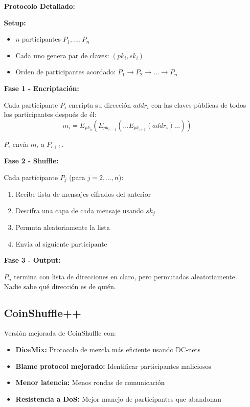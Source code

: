 \documentclass[11pt,a4paper,twoside]{book}
\begin{document}
\begin{mathnote}
\textbf{Protocolo Detallado:}

\textbf{Setup:}
\begin{itemize}
    \item $n$ participantes $P_1, ..., P_n$
    \item Cada uno genera par de claves: $(pk_i, sk_i)$
    \item Orden de participantes acordado: $P_1 \to P_2 \to ... \to P_n$
\end{itemize}

\textbf{Fase 1 - Encriptaci\'on:}

Cada participante $P_i$ encripta su direcci\'on $addr_i$ con las claves p\'ublicas de todos los participantes despu\'es de \'el:
\[
m_i = E_{pk_n}(E_{pk_{n-1}}(...E_{pk_{i+1}}(addr_i)...))
\]

$P_i$ env\'ia $m_i$ a $P_{i+1}$.

\textbf{Fase 2 - Shuffle:}

Cada participante $P_j$ (para $j = 2, ..., n$):
\begin{enumerate}
    \item Recibe lista de mensajes cifrados del anterior
    \item Descifra una capa de cada mensaje usando $sk_j$
    \item Permuta aleatoriamente la lista
    \item Env\'ia al siguiente participante
\end{enumerate}

\textbf{Fase 3 - Output:}

$P_n$ termina con lista de direcciones en claro, pero permutadas aleatoriamente. Nadie sabe qu\'e direcci\'on es de qui\'en.
\end{mathnote}

\subsection{CoinShuffle++}

\begin{definition}[CoinShuffle++]
Versi\'on mejorada de CoinShuffle con:
\begin{itemize}
    \item \textbf{DiceMix:} Protocolo de mezcla m\'as eficiente usando DC-nets
    \item \textbf{Blame protocol mejorado:} Identificar participantes maliciosos
    \item \textbf{Menor latencia:} Menos rondas de comunicaci\'on
    \item \textbf{Resistencia a DoS:} Mejor manejo de participantes que abandonan
\end{itemize}
\end{definition}
\end{document}
